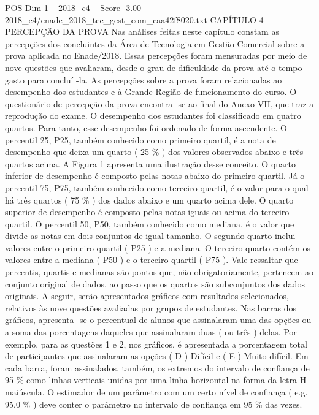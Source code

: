 \begin{textsample}{POS Dim 1 – 2018\_c4 – Score -3.00 – 2018\_c4/enade\_2018\_tec\_gest\_com\_caa42f8020.txt}  \label{ex:f1_pos_304}
CAPÍTULO 4 PERCEPÇÃO DA PROVA Nas análises feitas neste capítulo constam as percepções dos concluintes da Área de Tecnologia em Gestão Comercial sobre a prova aplicada no Enade/2018.
Essas percepções foram mensuradas por meio de nove questões que avaliaram, desde o grau de dificuldade da prova até o tempo gasto para concluí -la.
As percepções sobre a prova foram relacionadas ao desempenho dos estudantes e à Grande Região de funcionamento do curso.
O questionário de percepção da prova encontra -se ao final do Anexo VII, que traz a reprodução do exame.
O desempenho dos estudantes foi classificado em quatro quartos.
Para tanto, esse desempenho foi ordenado de forma ascendente.
O percentil 25, P25, também conhecido como primeiro quartil, é a nota de desempenho que deixa um quarto ( 25 \% ) dos valores observados abaixo e três quartos acima.
A Figura 1 apresenta uma ilustração desse conceito.
O quarto inferior de desempenho é composto pelas notas abaixo do primeiro quartil.
Já o percentil 75, P75, também conhecido como terceiro quartil, é o valor para o qual há três quartos ( 75 \% ) dos dados abaixo e um quarto acima dele.
O quarto superior de desempenho é composto pelas notas iguais ou acima do terceiro quartil.
O percentil 50, P50, também conhecido como mediana, é o valor que divide as notas em dois conjuntos de igual tamanho.
O segundo quarto inclui valores entre o primeiro quartil ( P25 ) e a mediana.
O terceiro quarto contém os valores entre a mediana ( P50 ) e o terceiro quartil ( P75 ).
Vale ressaltar que percentis, quartis e medianas são pontos que, não obrigatoriamente, pertencem ao conjunto original de dados, ao passo que os quartos são subconjuntos dos dados originais.
A seguir, serão apresentados gráficos com resultados selecionados, relativos às nove questões avaliadas por grupos de estudantes.
Nas barras dos gráficos, apresenta -se o percentual de alunos que assinalaram uma das opções ou a soma das porcentagens daqueles que assinalaram duas ( ou três ) delas.
Por exemplo, para as questões 1 e 2, nos gráficos, é apresentada a porcentagem total de participantes que assinalaram as opções ( D ) Difícil e ( E ) Muito difícil.
Em cada barra, foram assinalados, também, os extremos do intervalo de confiança de 95 \% como linhas verticais unidas por uma linha horizontal na forma da letra H maiúscula.
O estimador de um parâmetro com um certo nível de confiança ( e.g. 95,0 \% ) deve conter o parâmetro no intervalo de confiança em 95 \% das vezes.

\end{textsample}
